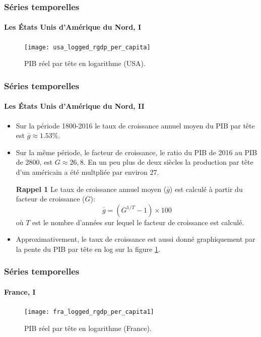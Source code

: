\documentclass[10pt]{beamer}
\begin{document}
\begin{frame}
  \frametitle{Séries temporelles}
  \framesubtitle{Les États Unis d'Amérique du Nord, I}
  \begin{figure}[H]
    \centering
    \texttt{[image: usa\_logged\_rgdp\_per\_capita]}
    \caption{PIB réel par tête en logarithme (USA).}
    \label{fig:maddison-rgdp-usa}
  \end{figure}

\end{frame}


\begin{frame}
  \frametitle{Séries temporelles}
  \framesubtitle{Les États Unis d'Amérique du Nord, II}

  \begin{itemize}
  \item Sur la période 1800-2016 le taux de croissance annuel moyen du PIB par tête est $\bar g \approx 1.53\%$.\newline

  \item Sur la même période, le facteur de croissance, le ratio du PIB de 2016 au PIB de 2800, est $G \approx 26,8$. En un peu plus de deux siècles la production par tête d'un américain a été multpliée par environ 27.\newline

  \item[\textbf{Rappel 1}] Le taux de croissance annuel moyen ($\bar g$) est calculé à partir du facteur de croissance ($G$):
    \[
         \bar g = (G^{1/T}-1)\times 100
    \]
    où $T$ est le nombre d'années sur lequel le facteur de croissance est calculé.\newline

  \item Approximativement, le taux de croissance est aussi donné graphiquement par la pente du PIB par tête en log sur la figure \ref{fig:maddison-rgdp-usa}.

  \end{itemize}

\end{frame}


\begin{frame}
  \frametitle{Séries temporelles}
  \framesubtitle{France, I}
  \begin{figure}[H]
    \centering
    \texttt{[image: fra\_logged\_rgdp\_per\_capita1]}
    \caption{PIB réel par tête en logarithme (France).}
    \label{fig:maddison-rgdp-fra-1}
  \end{figure}

\end{frame}
\end{document}
